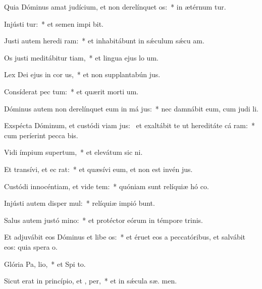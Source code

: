 \item Quia Dóminus amat judícium, et non derelínquet  os:~* in ætérnum tur.
\item Injústi tur:~* et semen impi bit.
\item Justi autem heredi ram:~* et inhabitábunt in sǽculum sǽcu  am.
\item Os justi meditábitur tiam,~* et lingua ejus lo um.
\item Lex Dei ejus in cor us,~* et non supplantabún  jus.
\item Consíderat pec tum:~* et quærit morti um.
\item Dóminus autem non derelínquet eum in má jus:~* nec damnábit eum, cum judi li.
\item Exspécta Dóminum, et custódi viam jus:~\pscross{} et exaltábit te ut hereditáte cá ram:~* cum períerint pecca bis.
\item Vidi ímpium supertum,~* et elevátum sic  ni.
\item Et transívi, et ec  rat:~* et quæsívi eum, et non est invén  jus.
\item Custódi innocéntiam, et vide tem:~* quóniam sunt relíquiæ hó co.
\item Injústi autem disper mul:~* relíquiæ impió bunt.
\item Salus autem justó  mino:~* et protéctor eórum in témpore trinis.
\item Et adjuvábit eos Dóminus et libe os:~* et éruet eos a peccatóribus, et salvábit eos: quia spera  o.
\item Glória Pa,  lio,~* et Spi to.
\item Sicut erat in princípio, et ,  per,~* et in sǽcula sæ. men.
